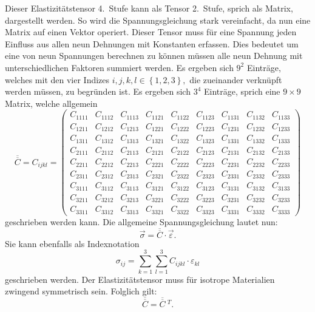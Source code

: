 Dieser Elastizitätstensor 4.~Stufe kann als Tensor 2.~Stufe, sprich als Matrix, dargestellt werden.
So wird die Spannungsgleichung stark vereinfacht, da nun eine Matrix auf einen Vektor operiert.
Dieser Tensor muss für eine Spannung jeden Einfluss aus allen neun Dehnungen mit Konstanten erfassen.
Dies bedeutet um eine von neun Spannungen berechnen zu können müssen alle neun Dehnung mit unterschiedlichen Faktoren summiert werden.
Es ergeben sich $9^2$ Einträge, welches mit den vier Indizes
\(
i, j, k, l\in\left\{1, 2, 3\right\}
,
\)
die zueinander verknüpft werden müssen, zu begründen ist.
Es ergeben sich $3^4$ Einträge, sprich eine $9\times9$ Matrix, welche allgemein
\[
\overline{\overline{C}}
=
C_{ijkl}
=
\begin{pmatrix}
C_{1111} & C_{1112} & C_{1113} & C_{1121} & C_{1122} & C_{1123} & C_{1131} & C_{1132} & C_{1133} \\
C_{1211} & C_{1212} & C_{1213} & C_{1221} & C_{1222} & C_{1223} & C_{1231} & C_{1232} & C_{1233} \\
C_{1311} & C_{1312} & C_{1313} & C_{1321} & C_{1322} & C_{1323} & C_{1331} & C_{1332} & C_{1333} \\
C_{2111} & C_{2112} & C_{2113} & C_{2121} & C_{2122} & C_{2123} & C_{2131} & C_{2132} & C_{2133} \\
C_{2211} & C_{2212} & C_{2213} & C_{2221} & C_{2222} & C_{2223} & C_{2231} & C_{2232} & C_{2233} \\
C_{2311} & C_{2312} & C_{2313} & C_{2321} & C_{2322} & C_{2323} & C_{2331} & C_{2332} & C_{2333} \\
C_{3111} & C_{3112} & C_{3113} & C_{3121} & C_{3122} & C_{3123} & C_{3131} & C_{3132} & C_{3133} \\
C_{3211} & C_{3212} & C_{3213} & C_{3221} & C_{3222} & C_{3223} & C_{3231} & C_{3232} & C_{3233} \\
C_{3311} & C_{3312} & C_{3313} & C_{3321} & C_{3322} & C_{3323} & C_{3331} & C_{3332} & C_{3333}
\end{pmatrix}
\]
geschrieben werden kann.
Die allgemeine Spannungsgleichung lautet nun:
\[
\vec\sigma
=
\overline{\overline{C}}\cdot\vec{\varepsilon}
.
\]
Sie kann ebenfalls als Indexnotation
\[
\sigma_{ij}
=
\sum_{k=1}^3
\sum_{l=1}^3
C_{ijkl}\cdot\varepsilon_{kl}
\]
geschrieben werden.
Der Elastizitätstensor muss für isotrope Materialien zwingend symmetrisch sein.
%
Folglich gilt:
\[
\overline{\overline{C}}
=
\overline{\overline{C}}~^{T}
.
\]

